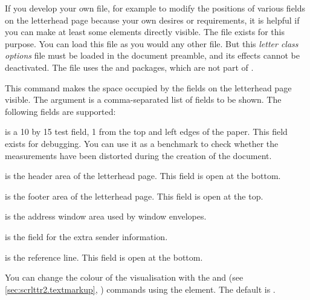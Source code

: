 \begin{Declaration}
\end{Declaration}
%
If you develop your own  file, for example to modify the positions
of various fields on the letterhead page because your own desires or
requirements, it is helpful if you can make at least some elements directly
visible. The  file
 exists for this
purpose. You can load this file as you would any other  file. But
this \emph{letter class options} file must be loaded in the document preamble,
and its effects cannot be deactivated. The  file uses the
%
 and
 packages, which are not part of
\KOMAScript.


\begin{Declaration}
\end{Declaration}
This command makes the space occupied by the fields on the letterhead page
visible. The  argument is a comma-separated list of fields
to be shown. The following fields are supported:
\begin{labeling}[~--]{}
\item[\PValue{test}] is a 10 by 15 test field, 1
  from the top and left edges of the paper. This field exists for debugging.
  You can use it as a benchmark to check whether the measurements have been
  distorted during the creation of the document.
\item[\PValue{head}] is the header area of the letterhead page. This field
  is open at the bottom.
\item[\PValue{foot}] is the footer area of the letterhead page. This field is
  open at the top.
\item[\PValue{address}] is the address window area used by window envelopes.
\item[\PValue{location}] is the field for the extra sender information.
\item[\PValue{refline}] is the reference line. This field is open at the
  bottom.
\end{labeling}%
%
You can change the colour of the visualisation with
the and 
(see \autoref{sec:scrlttr2.textmarkup},
) commands using the
 element. The default is
.%
%
%
\EndIndexGroup



